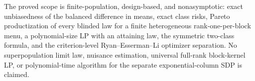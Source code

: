 The proved scope is finite-population, design-based, and nonasymptotic: exact unbiasedness of the balanced difference in means, exact class risks, Pareto productization of every blinded law for a finite heterogeneous rank-one-per-block menu, a polynomial-size LP with an attaining law, the symmetric two-class formula, and the criterion-level Ryan--Esserman--Li optimizer separation. No superpopulation limit law, nuisance estimation, universal full-rank block-kernel LP, or polynomial-time algorithm for the separate exponential-column SDP is claimed.